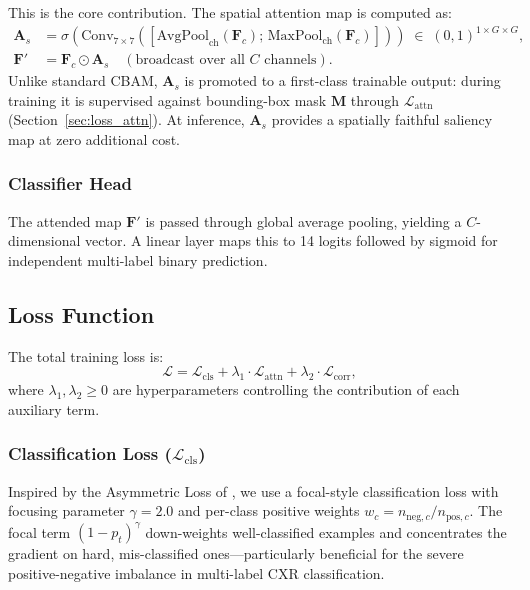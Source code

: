 \documentclass[12pt, a4paper]{article}
\begin{document}
This is the core contribution. The spatial attention map is computed as:
\begin{align}
  \mathbf{A}_s &= \sigma\!\left(\text{Conv}_{7\times7}\!\left(
    \left[\text{AvgPool}_{\text{ch}}(\mathbf{F}_c);\,
          \text{MaxPool}_{\text{ch}}(\mathbf{F}_c)\right]\right)\right)
    \;\in\; (0,1)^{1\times G\times G}, \label{eq:attn}\\
  \mathbf{F}' &= \mathbf{F}_c \odot \mathbf{A}_s \quad
    (\text{broadcast over all } C \text{ channels}). \label{eq:gated}
\end{align}
Unlike standard CBAM, $\mathbf{A}_s$ is promoted to a first-class trainable output:
during training it is supervised against bounding-box mask $\mathbf{M}$ through
$\mathcal{L}_{\text{attn}}$ (Section~\ref{sec:loss_attn}). At inference, $\mathbf{A}_s$
provides a spatially faithful saliency map at zero additional cost.

\subsubsection{Classifier Head}

The attended map $\mathbf{F}'$ is passed through global average pooling, yielding a
$C$-dimensional vector. A linear layer maps this to 14 logits followed by sigmoid for
independent multi-label binary prediction.

\subsection{Loss Function}
\label{sec:loss}

The total training loss is:
\begin{equation}
  \mathcal{L} = \mathcal{L}_{\text{cls}} + \lambda_1 \cdot \mathcal{L}_{\text{attn}}
              + \lambda_2 \cdot \mathcal{L}_{\text{corr}},
  \label{eq:total_loss}
\end{equation}
where $\lambda_1, \lambda_2 \geq 0$ are hyperparameters controlling the contribution of
each auxiliary term.

\subsubsection{Classification Loss ($\mathcal{L}_{\text{cls}}$)}

Inspired by the Asymmetric Loss of \citet{asl2021}, we use a focal-style classification
loss with focusing parameter $\gamma=2.0$ and per-class positive weights
$w_c = n_{\text{neg},c} / n_{\text{pos},c}$. The focal term $(1-p_t)^\gamma$
down-weights well-classified examples and concentrates the gradient on hard,
mis-classified ones---particularly beneficial for the severe positive-negative imbalance
in multi-label CXR classification.
\end{document}
